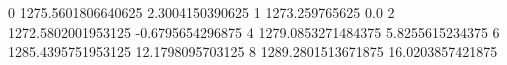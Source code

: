 0 1275.5601806640625 2.3004150390625
1 1273.259765625 0.0
2 1272.5802001953125 -0.6795654296875
4 1279.0853271484375 5.8255615234375
6 1285.4395751953125 12.1798095703125
8 1289.2801513671875 16.0203857421875
